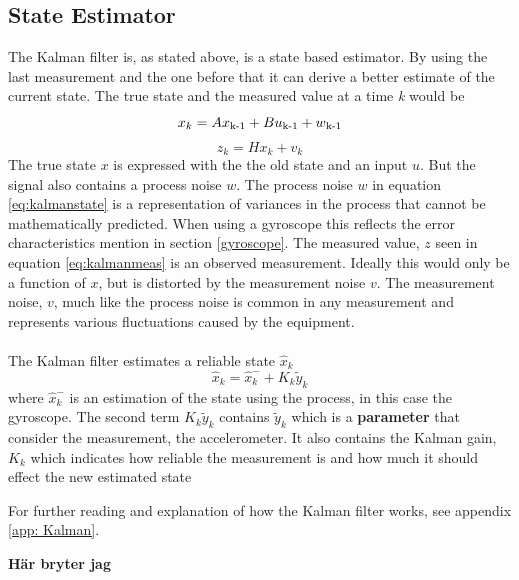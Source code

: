 \documentclass[a4paper,11pt]{kth-mag}
\begin{document}
\subsection{State Estimator}
The Kalman filter is, as stated above, is a state based estimator. By using the last measurement and the one before that it can derive a better estimate of the current state. The true state and the measured value at a time \textit{k} would be
\begin{equation}\label{eq:kalmanstate}
x_k = Ax\textsubscript{k-1}+Bu\textsubscript{k-1}+w\textsubscript{k-1}
\end{equation}
\begin{equation} \label{eq:kalmanmeas}
z_k = Hx_k + v_k
\end{equation}
The true state $x$ is expressed with the the old state and an input $u$. But the signal also contains a process noise $w$. The process noise $w$ in equation \eqref{eq:kalmanstate} is a representation of variances in the process that cannot be mathematically predicted. When using a gyroscope this reflects the error characteristics mention in section \ref{gyroscope}. 
The measured value, $z$ seen in equation \eqref{eq:kalmanmeas} is an observed measurement. Ideally this would only be a function of $x$, but is distorted by the measurement noise $v$.
The measurement noise, $v$, much like the process noise is common in any measurement and represents various fluctuations caused by the equipment.
\\ \\
The Kalman filter estimates a reliable state $\hat{x}_k$
\begin{equation}
\hat{x}_k = \hat{x}^-_k + K_k\tilde{y}_k
\end{equation}
where $\hat{x}^-_k$ is an estimation of the state using the process, in this case the gyroscope. The second term $K_k\tilde{y}_k$ contains $\tilde{y}_k$ which is a \textbf{parameter} that consider the measurement, the accelerometer. It also contains the Kalman gain, $K_k$ which indicates how reliable the measurement is and how much it should effect the new estimated state

For further reading and explanation of how the Kalman filter works, see appendix \ref{app: Kalman}.

\textbf{Här bryter jag}
\end{document}
